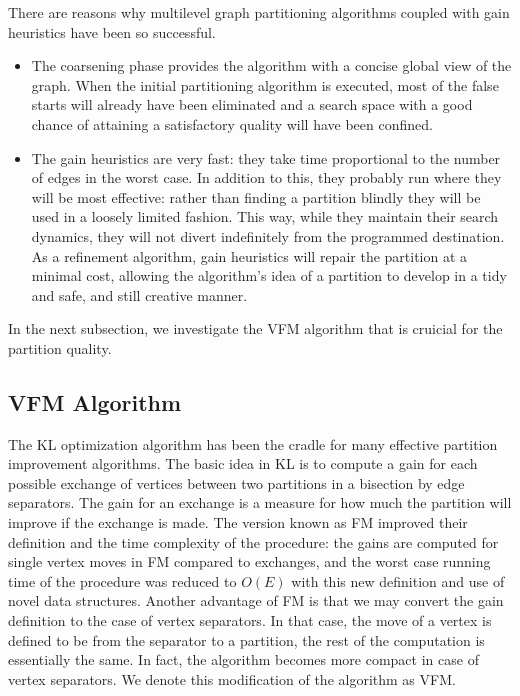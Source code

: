 \documentclass[a4paper,12pt]{article}
\begin{document}
There are reasons why multilevel graph partitioning algorithms coupled
with gain heuristics have been so successful.
\begin{itemize}
\item The coarsening phase provides the algorithm with a concise
global view of the graph. When the initial partitioning algorithm is
executed, most of the false starts will already have been eliminated
and a search space with a good chance of attaining a satisfactory
quality will have been confined.
\item The gain heuristics are very fast: they take time proportional
to the number of edges in the worst case. In addition to this, they
probably run where they will be most effective: rather than finding a
partition blindly they will be used in a loosely limited fashion. This
way, while they maintain their search dynamics, they will not divert
indefinitely from the programmed destination. As a refinement algorithm, gain
heuristics will repair the partition at a minimal cost, allowing the
algorithm's idea of a partition to develop in a tidy and safe, and
still creative manner.
\end{itemize}

In the next subsection, we investigate the VFM algorithm that is
cruicial for the partition quality.


\subsection{VFM Algorithm}

The KL optimization algorithm has been the cradle for many effective
partition improvement algorithms. The basic idea in KL is to compute
a gain for each possible exchange of vertices between two partitions
in a bisection by edge separators.\cite{kl} The gain for an exchange is
a measure for how much the partition will improve if the exchange is
made. The version known as FM improved their definition and the time
complexity of the procedure: the gains are computed for single vertex moves
in FM compared to exchanges, and the worst case running time of the
procedure was reduced to $O(E)$ with this new definition and use of
novel data structures. Another advantage of FM is that we may convert
the gain definition to the case of vertex separators. In that case,
the move of a vertex is defined to be from the separator to a
partition, the rest of the computation is essentially the same. In
fact, the algorithm becomes more compact in case of vertex
separators. We denote this modification of the algorithm as VFM.
\end{document}

